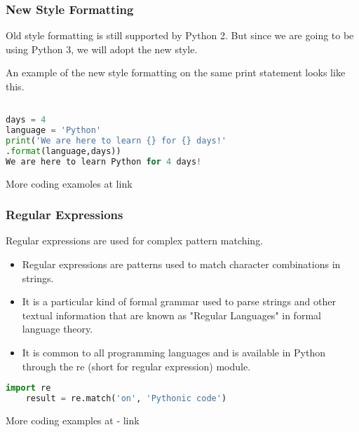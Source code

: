 \documentclass{beamer}
\begin{document}
\begin{frame}[fragile]
\frametitle{New Style Formatting}
Old style formatting is still supported by Python 2. But since we are going to be using Python 3, we will adopt the new style.


An example of the new style formatting on the same print statement looks like this.
\begin{lstlisting}[language=Python]

days = 4
language = 'Python'
print('We are here to learn {} for {} days!'
.format(language,days))
We are here to learn Python for 4 days!
\end{lstlisting}
More coding examoles at link
\end{frame}

\begin{frame}[fragile]
\frametitle{Regular Expressions}
Regular expressions are used for complex pattern matching.
\begin{itemize}
\item Regular expressions are patterns used to match character combinations in strings.
\item It is a particular kind of formal grammar used to parse strings and other textual information that are known as "Regular Languages" in formal language theory.
\item It is common to all programming languages and is available in Python through the re (short for regular expression) module.
\end{itemize}
\begin{lstlisting}[language=Python]
	import re
	result = re.match('on', 'Pythonic code')
\end{lstlisting}
More coding examples at - link
\end{frame}
\end{document}
